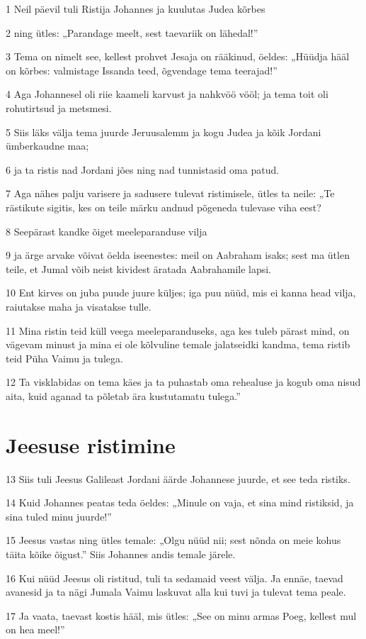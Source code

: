 \par 1 Neil päevil tuli Ristija Johannes ja kuulutas Judea kõrbes
\par 2 ning ütles: „Parandage meelt, sest taevariik on lähedal!”
\par 3 Tema on nimelt see, kellest prohvet Jesaja on rääkinud, öeldes: „Hüüdja hääl on kõrbes: valmistage Issanda teed, õgvendage tema teerajad!”
\par 4 Aga Johannesel oli riie kaameli karvust ja nahkvöö vööl; ja tema toit oli rohutirtsud ja metsmesi.
\par 5 Siis läks välja tema juurde Jeruusalemm ja kogu Judea ja kõik Jordani ümberkaudne maa;
\par 6 ja ta ristis nad Jordani jões ning nad tunnistasid oma patud.
\par 7 Aga nähes palju varisere ja sadusere tulevat ristimisele, ütles ta neile: „Te rästikute sigitis, kes on teile märku andnud põgeneda tulevase viha eest?
\par 8 Seepärast kandke õiget meeleparanduse vilja
\par 9 ja ärge arvake võivat öelda iseenestes: meil on Aabraham isaks; sest ma ütlen teile, et Jumal võib neist kividest äratada Aabrahamile lapsi.
\par 10 Ent kirves on juba puude juure küljes; iga puu nüüd, mis ei kanna head vilja, raiutakse maha ja visatakse tulle.
\par 11 Mina ristin teid küll veega meeleparanduseks, aga kes tuleb pärast mind, on vägevam minust ja mina ei ole kõlvuline temale jalatseidki kandma, tema ristib teid Püha Vaimu ja tulega.
\par 12 Ta visklabidas on tema käes ja ta puhastab oma rehealuse ja kogub oma nisud aita, kuid aganad ta põletab ära kustutamatu tulega.”

\section*{Jeesuse ristimine}

\par 13 Siis tuli Jeesus Galileast Jordani äärde Johannese juurde, et see teda ristiks.
\par 14 Kuid Johannes peatas teda öeldes: „Minule on vaja, et sina mind ristiksid, ja sina tuled minu juurde!”
\par 15 Jeesus vastas ning ütles temale: „Olgu nüüd nii; sest nõnda on meie kohus täita kõike õigust.” Siis Johannes andis temale järele.
\par 16 Kui nüüd Jeesus oli ristitud, tuli ta sedamaid veest välja. Ja ennäe, taevad avanesid ja ta nägi Jumala Vaimu laskuvat alla kui tuvi ja tulevat tema peale.
\par 17 Ja vaata, taevast kostis hääl, mis ütles: „See on minu armas Poeg, kellest mul on hea meel!”


